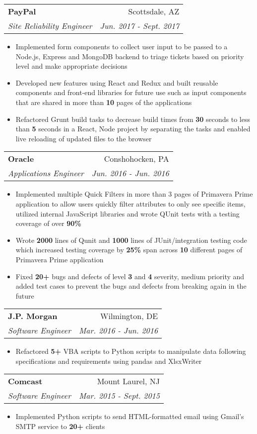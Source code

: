 \documentclass[letterpaper,10.5pt]{article}
\makeatletter
\newcommand{\resumeItem}[2]{
  \item\small{
    \textbf{#1}{#2 \vspace{-2pt}}
  }
}
\newcommand{\resumeSubheading}[4]{
  \vspace{-1pt}\item
    \begin{tabular*}{0.97\textwidth}[t]{l@{\extracolsep{\fill}}r}
      \textbf{#1} & #2 \\
      \textit{\small#3} & \textit{\small #4} \\
    \end{tabular*}\vspace{-5pt}
}
\newcommand{\resumeItemListStart}{\begin{itemize}}
\newcommand{\resumeItemListEnd}{\end{itemize}\vspace{-5pt}}
\makeatother
\begin{document}
    \resumeSubheading
      {PayPal}{Scottsdale, AZ}
      {Site Reliability Engineer}{Jun. 2017 - Sept. 2017}
      \resumeItemListStart
        \resumeItem{}
          {Implemented form components to collect user input to be passed to a Node.js, Express and MongoDB backend to triage tickets based on priority level and make appropriate decisions}
        \resumeItem{}
          {Developed new features using React and Redux and built reusable components and front-end libraries for future use such as input components that are shared in more than \textbf{10} pages of the applications}
        \resumeItem{}
          {Refactored Grunt build tasks to decrease build times from \textbf{30} seconds to less than \textbf{5} seconds in a React, Node project by separating the tasks and enabled live reloading of updated files to the browser}
      \resumeItemListEnd
      
    \resumeSubheading
      {Oracle}{Conshohocken, PA}
      {Applications Engineer}{Jun. 2016 - Jun. 2016}
      \resumeItemListStart
        \resumeItem{}
          {Implemented multiple Quick Filters in more than 3 pages of Primavera Prime application to allow users quickly filter attributes to only see specific items, utilized internal JavaScript libraries and wrote QUnit tests with a testing coverage of over \textbf{90\%}}
        \resumeItem{}
          {Wrote \textbf{2000} lines of Qunit and \textbf{1000} lines of JUnit/integration testing code which increased testing coverage by \textbf{25\%} span across \textbf{10} different pages of Primavera Prime application}
        \resumeItem{}
          {Fixed \textbf{20+} bugs and defects of level \textbf{3} and \textbf{4} severity, medium priority and added test cases to prevent the bugs and defects from breaking again in the future}
      \resumeItemListEnd
      
    \resumeSubheading
      {J.P. Morgan}{Wilmington, DE}
      {Software Engineer}{Mar. 2016 - Jun. 2016}
      \resumeItemListStart
        \resumeItem{}
          {Refactored \textbf{5+} VBA scripts to Python scripts to manipulate data following specifications and requirements using pandas and XlsxWriter}
      \resumeItemListEnd
      
    \resumeSubheading
      {Comcast}{Mount Laurel, NJ}
      {Software Engineer}{Mar. 2015 - Sept. 2015}
      \resumeItemListStart
        \resumeItem{}
          {Implemented Python scripts to send HTML-formatted email using Gmail’s SMTP service to \textbf{20+} clients}
      \resumeItemListEnd
\end{document}
